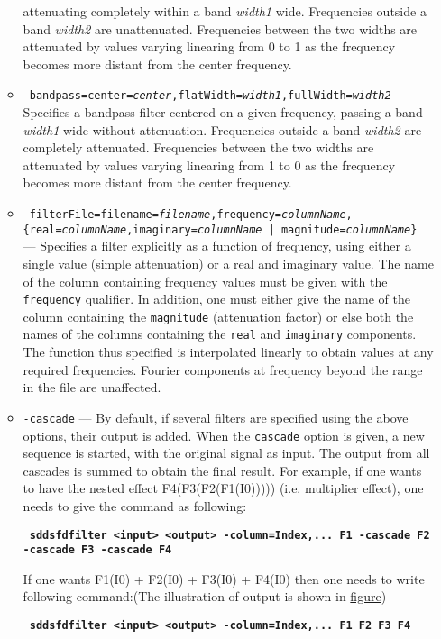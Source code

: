 \begin{itemize}
\begin{itemize}
    attenuating completely within a band {\em width1} wide.  
    Frequencies outside a band {\em width2} are unattenuated. 
    Frequencies between the two widths are attenuated by values varying 
    linearing from 0 to 1 as the frequency becomes more distant from 
    the center frequency. 
    \item {\tt -bandpass=center={\em center},flatWidth={\em width1},fullWidth={\em width2}} 
    --- Specifies a bandpass filter centered on a given frequency,  
    passing a band {\em width1} wide without attenuation. 
    Frequencies outside a band {\em width2} are completely attenuated. 
    Frequencies between the two widths are attenuated by values varying 
    linearing from 1 to 0 as the frequency becomes more distant from 
    the center frequency. 
    \item {\tt -filterFile=filename={\em filename},frequency={\em columnName},}
        {\tt \{real={\em columnName},imaginary={\em columnName} | magnitude={\em columnName}\} }
        --- Specifies a filter explicitly 
    as a function of frequency, using either a single value  
    (simple attenuation) or a real and imaginary value. 
    The name of the column containing frequency values must be 
    given with the {\tt frequency} qualifier. 
    In addition, one must either give the name of the column  
    containing the {\tt magnitude} (attenuation factor) or else 
    both the names of the columns containing  
    the {\tt real} and {\tt imaginary} components.   
    The function thus specified is interpolated linearly to 
    obtain values at any required frequencies.  Fourier components 
    at frequency beyond the range in the file are unaffected. 
    \item {\tt -cascade} --- By default, if several filters are 
    specified using the above options, their output is added.
    When the {\tt cascade} option is given, a 
    new sequence is started, with the original signal as input. 
    The output from all cascades is summed to obtain the final 
    result. For example, if one wants to have the nested effect 
    F4(F3(F2(F1(I0))))) (i.e. multiplier effect), one needs to give the command as following:
     \begin{flushleft}{\tt \bf
    sddsfdfilter <input> <output> -column=Index,... F1 -cascade F2 -cascade F3 -cascade F4 
     }\end{flushleft}

    If one wants F1(I0) + F2(I0) + F3(I0) + F4(I0) then one needs to write following command:(The illustration of output is shown in \href{http://ops.aps.anl.gov/manuals/example_files/sddsfdfilter_img1.html}{figure})
    \begin{flushleft}{\tt \bf
    sddsfdfilter <input> <output> -column=Index,... F1 F2 F3 F4 
    }\end{flushleft}


\end{itemize}
\end{itemize}
